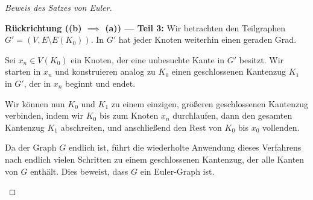 \begin{proof}[Beweis des Satzes von Euler]
\begin{math-stroke}
\textbf{Rückrichtung (\texorpdfstring{\textbf{(b)} $\implies$ \textbf{(a)}}{b -> a}) --- Teil 3:}
Wir betrachten den Teilgraphen $G' = (V, E \setminus E(K_0))$. In $G'$ hat jeder Knoten weiterhin einen geraden Grad. 

Sei $x_n \in V(K_0)$ ein Knoten, der eine unbesuchte Kante in $G'$ besitzt. Wir starten in $x_n$ und konstruieren analog zu $K_0$ einen geschlossenen Kantenzug $K_1$ in $G'$, der in $x_n$ beginnt und endet.

Wir können nun $K_0$ und $K_1$ zu einem einzigen, größeren geschlossenen Kantenzug verbinden, indem wir $K_0$ bis zum Knoten $x_n$ durchlaufen, dann den gesamten Kantenzug $K_1$ abschreiten, und anschließend den Rest von $K_0$ bis $x_0$ vollenden.

\begin{center}
\end{center}

Da der Graph $G$ endlich ist, führt die wiederholte Anwendung dieses Verfahrens nach endlich vielen Schritten zu einem geschlossenen Kantenzug, der alle Kanten von $G$ enthält. Dies beweist, dass $G$ ein Euler-Graph ist.
\end{math-stroke}
\end{proof}

